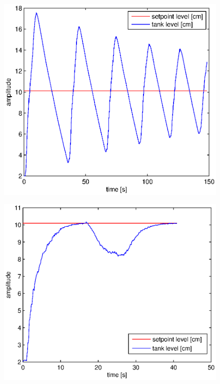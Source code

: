 \documentclass[frenchb, paper=a4, fontsize=11pt]{scrartcl}
\numberwithin{equation}{section}					%
\numberwithin{figure}{section}					%
\numberwithin{table}{section}						%
\begin{document}
\begin{figure}[!ht]
\centering
\begin{minipage}{.5\textwidth}
  \centering
  \includegraphics[width=.99\linewidth]{img/cl-2_5-2.eps}
  \label{fig:test1}
\end{minipage}%
\begin{minipage}{.5\textwidth}
  \centering
  \includegraphics[width=.99\linewidth]{img/cl-10-0.eps}
  \label{fig:test2}
\end{minipage}
\end{figure}
\end{document}
